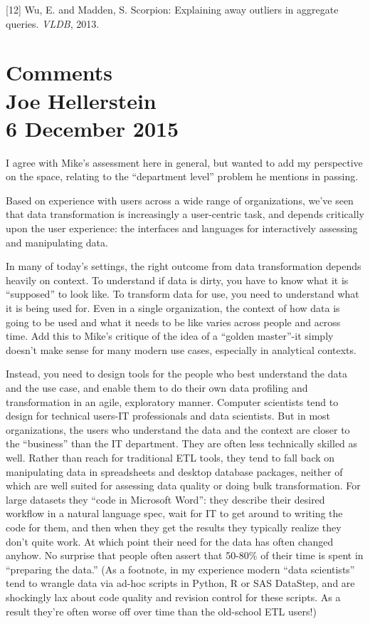 \documentclass[b5paper,11pt,twoside,openright]{book}
\begin{document}
\leavevmode\hypertarget{ref-scorpion}{}%
{[}12{]} Wu, E. and Madden, S. Scorpion: Explaining away outliers in
aggregate queries. \emph{VLDB}, 2013.

\section*[Comments]{Comments\\%
{\normalsize Joe Hellerstein}\\%
{\normalsize 6 December 2015}%
}

I agree with Mike's assessment here in general, but wanted to add my
perspective on the space, relating to the ``department level'' problem
he mentions in passing.

Based on experience with users across a wide range of organizations,
we've seen that data transformation is increasingly a user-centric task,
and depends critically upon the user experience: the interfaces and
languages for interactively assessing and manipulating data.

In many of today's settings, the right outcome from data transformation
depends heavily on context. To understand if data is dirty, you have to
know what it is ``supposed'' to look like. To transform data for use,
you need to understand what it is being used for. Even in a single
organization, the context of how data is going to be used and what it
needs to be like varies across people and across time. Add this to
Mike's critique of the idea of a ``golden master''-it simply doesn't
make sense for many modern use cases, especially in analytical contexts.

Instead, you need to design tools for the people who best understand the
data and the use case, and enable them to do their own data profiling
and transformation in an agile, exploratory manner. Computer scientists
tend to design for technical users-IT professionals and data scientists.
But in most organizations, the users who understand the data and the
context are closer to the ``business'' than the IT department. They are
often less technically skilled as well. Rather than reach for
traditional ETL tools, they tend to fall back on manipulating data in
spreadsheets and desktop database packages, neither of which are well
suited for assessing data quality or doing bulk transformation. For
large datasets they ``code in Microsoft Word'': they describe their
desired workflow in a natural language spec, wait for IT to get around
to writing the code for them, and then when they get the results they
typically realize they don't quite work. At which point their need for
the data has often changed anyhow. No surprise that people often assert
that 50-80\% of their time is spent in ``preparing the data.'' (As a
footnote, in my experience modern ``data scientists'' tend to wrangle
data via ad-hoc scripts in Python, R or SAS DataStep, and are shockingly
lax about code quality and revision control for these scripts. As a
result they're often worse off over time than the old-school ETL users!)
\end{document}

